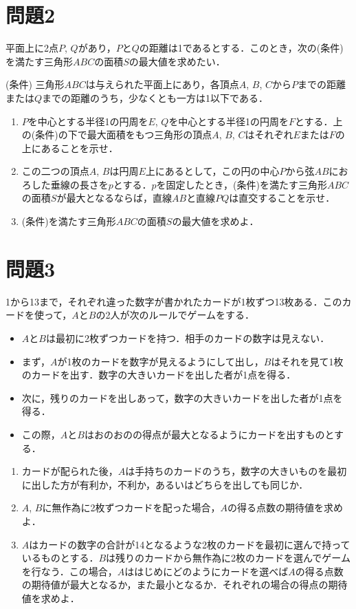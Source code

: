 \documentclass[unicode,12pt, A4j]{ltjsarticle}%
\begin{document}
\section{問題2}
平面上に2点$P$, $Q$があり，$P$と$Q$の距離は1であるとする．このとき，次の(条件)を満たす三角形$ABC$の面積$S$の最大値を求めたい．

(条件) 三角形$ABC$は与えられた平面上にあり，各頂点$A$, $B$, $C$から$P$までの距離または$Q$までの距離のうち，少なくとも一方は1以下である．

\begin{enumerate}
 \item $P$を中心とする半径1の円周を$E$, $Q$を中心とする半径1の円周を$F$とする．上の(条件)の下で最大面積をもつ三角形の頂点$A$, $B$, $C$はそれぞれ$E$または$F$の上にあることを示せ．
 \item この二つの頂点$A$, $B$は円周$E$上にあるとして，この円の中心$P$から弦$AB$におろした垂線の長さを$p$とする．$p$を固定したとき，(条件)を満たす三角形$ABC$の面積$S$が最大となるならば，直線$AB$と直線$PQ$は直交することを示せ．
 \item (条件)を満たす三角形$ABC$の面積$S$の最大値を求めよ．
\end{enumerate}

\section{問題3}
1から13まで，それぞれ違った数字が書かれたカードが1枚ずつ13枚ある．このカードを使って，$A$と$B$の2人が次のルールでゲームをする．
\begin{itemize}
 \item $A$と$B$は最初に2枚ずつカードを持つ．相手のカードの数字は見えない．
 \item まず，$A$が1枚のカードを数字が見えるようにして出し，$B$はそれを見て1枚のカードを出す．数字の大きいカードを出した者が1点を得る．
 \item 次に，残りのカードを出しあって，数字の大きいカードを出した者が1点を得る．
 \item この際，$A$と$B$はおのおのの得点が最大となるようにカードを出すものとする．
\end{itemize}

\begin{enumerate}
 \item カードが配られた後，$A$は手持ちのカードのうち，数字の大きいものを最初に出した方が有利か，不利か，あるいはどちらを出しても同じか．
 \item $A$, $B$に無作為に2枚ずつカードを配った場合，$A$の得る点数の期待値を求めよ．
 \item $A$はカードの数字の合計が14となるような2枚のカードを最初に選んで持っているものとする．$B$は残りのカードから無作為に2枚のカードを選んでゲームを行なう．この場合，$A$ははじめにどのようにカードを選べば$A$の得る点数の期待値が最大となるか，また最小となるか．それぞれの場合の得点の期待値を求めよ．
\end{enumerate}
\end{document}
